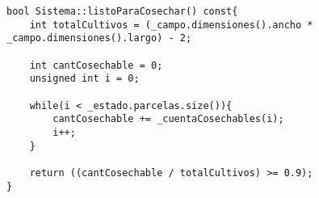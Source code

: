 \begin{lstlisting}
bool Sistema::listoParaCosechar() const{
	int totalCultivos = (_campo.dimensiones().ancho * _campo.dimensiones().largo) - 2;

	int cantCosechable = 0;
    unsigned int i = 0;

	while(i < _estado.parcelas.size()){
        cantCosechable += _cuentaCosechables(i);
		i++;
    }

    return ((cantCosechable / totalCultivos) >= 0.9);
}
\end{lstlisting}